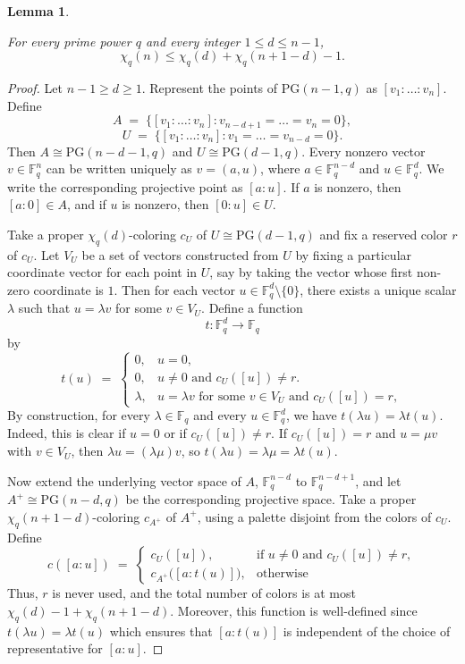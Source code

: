 \documentclass[11pt]{article}
\theoremstyle{plain}
\newtheorem{lemma}{Lemma}
\newcommand{\PG}{\mathrm{PG}}
\begin{document}
\begin{lemma}\label{lem:recursion}

For every prime power $q$ and every integer $1\le d\le n-1$,
\[
\chi_q(n)\le \chi_q(d)+ \chi_q(n+1-d)-1.
\]
\end{lemma}

\begin{proof}
Let $n-1\ge d\ge 1$.
Represent the points of $\PG(n-1,q)$ as $[v_1:\dots:v_n]$.
Define
\[
A \;=\; \bigl\{[v_1:\dots:v_n] : v_{n-d+1}=\dots=v_n=0\bigr\},
\]
\[
U \;=\; \bigl\{[v_1:\dots:v_n] : v_1=\dots=v_{n-d}=0\bigr\}.
\]
Then $A\cong\PG(n-d-1,q)$ and $U\cong\PG(d-1,q)$.
Every nonzero vector $v\in \mathbb F_q^n$ can be written uniquely as $v=(a,u)$, where $a\in \mathbb F_q^{n-d}$ and $u\in \mathbb F_q^d$. We write the corresponding projective point as $[a:u]$.
If $a$ is nonzero, then $[a:0]\in A$, and if $u$ is nonzero, then $[0:u]\in U$.

Take a proper $\chi_q(d)$-coloring $c_U$ of $U\cong\PG(d-1,q)$ and fix a reserved color $r$ of $c_U$.
Let $V_U$ be a set of vectors constructed from $U$ by fixing a particular coordinate vector for each point in $U$, say by taking the vector whose first non-zero coordinate is $1$.
Then for each vector $u \in \mathbb{F}_q^{d} \setminus \{0\}$, there exists a unique scalar $\lambda$ such that $u = \lambda v$ for some $v \in V_U$.
Define a function
\[
t:\mathbb{F}_q^{d} \longrightarrow \mathbb{F}_q
\]
by
\[
t(u) \;=\;
\begin{cases}
0, & u=0,\\
0, & u\neq 0 \text{ and } c_U([u])\neq r.\\
\lambda, & u = \lambda v  \text{ for some } v \in V_U \text{ and } c_U([u])=r,
\end{cases}
\]
By construction, for every $\lambda\in\mathbb F_q$ and every $u\in\mathbb F_q^d$, we have $t(\lambda u)=\lambda t(u)$.
Indeed, this is clear if $u=0$ or if $c_U([u])\neq r$. If $c_U([u])=r$ and $u=\mu v$ with $v\in V_U$, then $\lambda u=(\lambda\mu)v$, so $t(\lambda u)=\lambda\mu=\lambda t(u)$.

Now extend the underlying vector space of $A$, $\mathbb F_q^{n-d}$ to $\mathbb F_q^{n-d+1}$, and let $A^+\cong\PG(n-d,q)$ be the corresponding projective space.
Take a proper $\chi_q(n+1-d)$-coloring $c_{A^+}$ of $A^+$, using a palette disjoint from the colors of $c_U$.
Define
\[
c([a:u]) \;=\;
\begin{cases}
c_U([u]), & \text{if } u\neq 0 \text{ and } c_U([u])\neq r,\\[3pt]
c_{A^+}\bigl([a:t(u)]\bigr), & \text{otherwise}
\end{cases}
\]
Thus, $r$ is never used, and the total number of colors is at most $\chi_q(d)-1+\chi_q(n+1-d)$.
Moreover, this function is well-defined since $t(\lambda u) = \lambda t(u)$ which ensures that $[a:t(u)]$ is independent of the choice of representative for $[a:u]$.



\end{proof}
\end{document}
